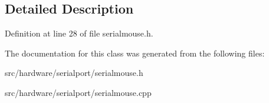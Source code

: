 \subsection{Detailed Description}


Definition at line 28 of file serialmouse.\-h.



The documentation for this class was generated from the following files\-:\begin{DoxyCompactItemize}
\item 
src/hardware/serialport/serialmouse.\-h\item 
src/hardware/serialport/serialmouse.\-cpp\end{DoxyCompactItemize}
